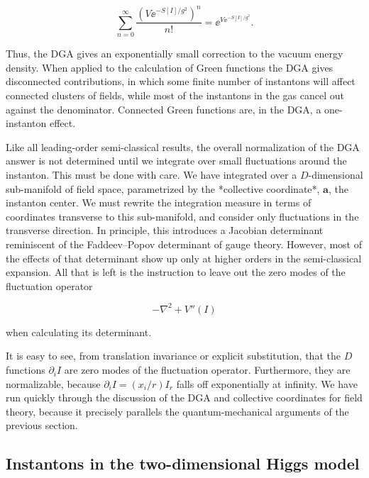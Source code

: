 \[
  \sum_{n=0}^{\infty}\frac{(V\ee^{-S[I]/g^2})^n}{n!}
  =\ee^{V\ee^{-S[I]/g^2}}.
\]

Thus, the DGA gives an exponentially small correction to the vacuum energy
density. When applied to the calculation of Green functions the DGA gives
disconnected contributions, in which some finite number of instantons will
affect connected clusters of fields, while most of the instantons in the gas
cancel out against the denominator. Connected Green functions are, in the DGA,
a one-instanton effect.

Like all leading-order semi-classical results, the overall normalization of the
DGA answer is not determined until we integrate over small fluctuations around
the instanton. This must be done with care. We have integrated over a
$D$-dimensional sub-manifold of field space, parametrized by the *collective
coordinate*, $\mathbf a$, the instanton center. We must rewrite the integration measure
in terms of coordinates transverse to this sub-manifold, and consider only
fluctuations in the transverse direction. In principle, this introduces a
Jacobian determinant reminiscent of the Faddeev--Popov determinant of gauge
theory. However, most of the effects of that determinant show up only at higher
orders in the semi-classical expansion. All that is left is the instruction to
leave out the zero modes of the fluctuation operator

\[
  -\nabla^2+V''(I)
\]

when calculating its determinant.

It is easy to see, from translation invariance or explicit substitution, that the
$D$ functions $\partial_iI$ are zero modes of the fluctuation operator.
Furthermore, they are normalizable, because
$\partial_iI=(x_i/r)I_r$ falls off exponentially at infinity. We have run
quickly through the discussion of the DGA and collective coordinates for field
theory, because it precisely parallels the quantum-mechanical arguments of the
previous section.

\subsection{Instantons in the two-dimensional Higgs model}
